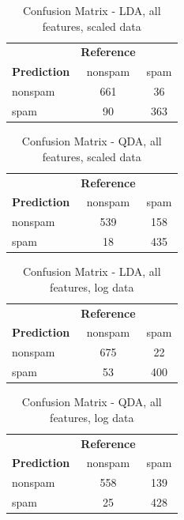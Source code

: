 \documentclass{article}\usepackage[]{graphicx}\usepackage[]{xcolor}
\begin{document}
\begin{table}[h]
	\centering
	\begin{tabular}{lcc}
		& \textbf{Reference} & \\
		\textbf{Prediction} & nonspam & spam \\
		nonspam & 661 & 36 \\
		spam & 90 & 363 \\
	\end{tabular}
	\caption{Confusion Matrix - LDA, all features, scaled data}
	\label{tab:confusion_matrix_lda1}
\end{table}

\begin{table}[h]
	\centering
	\begin{tabular}{lcc}
		& \textbf{Reference} & \\
		\textbf{Prediction} & nonspam & spam \\
		nonspam & 539 & 158 \\
		spam & 18 & 435 \\
	\end{tabular}
	\caption{Confusion Matrix - QDA, all features, scaled data}
	\label{tab:confusion_matrix_qda1}
\end{table}

\begin{table}[h]
	\centering
	\begin{tabular}{lcc}
		& \textbf{Reference} & \\
		\textbf{Prediction} & nonspam & spam \\
		nonspam & 675 & 22 \\
		spam & 53 & 400 \\
	\end{tabular}
	\caption{Confusion Matrix - LDA, all features, log data}
	\label{tab:confusion_matrix_lda1_log}
\end{table}

\begin{table}[h]
	\centering
	\begin{tabular}{lcc}
		& \textbf{Reference} & \\
		\textbf{Prediction} & nonspam & spam \\
		nonspam & 558 & 139 \\
		spam & 25 & 428 \\
	\end{tabular}
	\caption{Confusion Matrix - QDA, all features, log data}
	\label{tab:confusion_matrix_qda1_log}
\end{table}
\end{document}

